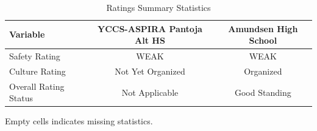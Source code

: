 \begin{table}[H]
\renewcommand{\arraystretch}{1.5}
\caption*{
{\large Ratings Summary Statistics}
} 

\fontsize{10pt}{11pt}\selectfont

\begin{tabular*}{\linewidth}{@{\extracolsep{\fill}}lcc}
\toprule
Variable & YCCS-ASPIRA Pantoja Alt HS & Amundsen High School \\ 
\midrule\addlinespace[2.5pt]
Safety Rating & WEAK & WEAK \\
Culture Rating & Not Yet Organized & Organized \\
Overall Rating Status & Not Applicable & Good Standing \\
\bottomrule
\end{tabular*}
\begin{minipage}{\linewidth}
Empty cells indicates missing statistics.\\
\end{minipage}
\end{table}
